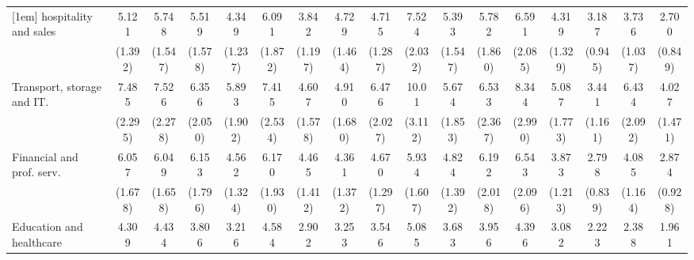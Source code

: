 {\begin{tabular}{l*{16}{c}}
[1em]
hospitality and sales&       5.121\sym{***}&       5.748\sym{***}&       5.519\sym{***}&       4.349\sym{***}&       6.091\sym{***}&       3.842\sym{***}&       4.729\sym{***}&       4.715\sym{***}&       7.524\sym{***}&       5.393\sym{***}&       5.782\sym{***}&       6.591\sym{***}&       4.319\sym{***}&       3.187\sym{***}&       3.736\sym{***}&       2.700\sym{**} \\
                    &     (1.392)         &     (1.547)         &     (1.578)         &     (1.237)         &     (1.872)         &     (1.197)         &     (1.464)         &     (1.287)         &     (2.032)         &     (1.547)         &     (1.860)         &     (2.085)         &     (1.329)         &     (0.945)         &     (1.037)         &     (0.849)         \\
[1em]
Transport, storage and IT.&       7.485\sym{***}&       7.526\sym{***}&       6.356\sym{***}&       5.893\sym{***}&       7.415\sym{***}&       4.607\sym{***}&       4.910\sym{***}&       6.476\sym{***}&       10.01\sym{***}&       5.674\sym{***}&       6.533\sym{***}&       8.344\sym{***}&       5.087\sym{***}&       3.441\sym{***}&       6.434\sym{***}&       4.027\sym{***}\\
                    &     (2.295)         &     (2.278)         &     (2.050)         &     (1.902)         &     (2.534)         &     (1.578)         &     (1.680)         &     (2.027)         &     (3.112)         &     (1.853)         &     (2.367)         &     (2.990)         &     (1.773)         &     (1.161)         &     (2.092)         &     (1.471)         \\
[1em]
Financial and prof. serv.&       6.057\sym{***}&       6.049\sym{***}&       6.153\sym{***}&       4.562\sym{***}&       6.170\sym{***}&       4.465\sym{***}&       4.361\sym{***}&       4.670\sym{***}&       5.934\sym{***}&       4.824\sym{***}&       6.192\sym{***}&       6.543\sym{***}&       3.873\sym{***}&       2.798\sym{***}&       4.085\sym{***}&       2.874\sym{**} \\
                    &     (1.678)         &     (1.658)         &     (1.796)         &     (1.324)         &     (1.930)         &     (1.412)         &     (1.372)         &     (1.297)         &     (1.607)         &     (1.392)         &     (2.018)         &     (2.096)         &     (1.213)         &     (0.839)         &     (1.164)         &     (0.928)         \\
[1em]
Education and healthcare&       4.309\sym{***}&       4.434\sym{***}&       3.806\sym{***}&       3.216\sym{***}&       4.584\sym{***}&       2.902\sym{***}&       3.253\sym{***}&       3.546\sym{***}&       5.085\sym{***}&       3.683\sym{***}&       3.956\sym{***}&       4.396\sym{***}&       3.082\sym{***}&       2.223\sym{**} &       2.388\sym{**} &       1.961\sym{*}  \\

\end{tabular}}
